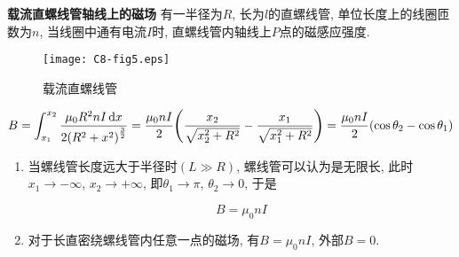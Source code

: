 \begin{example}
	\textbf{载流直螺线管轴线上的磁场} \quad 有一半径为$R$, 长为$l$的直螺线管, 单位长度上的线圈匝数为$n$, 当线圈中通有电流$I$时, 直螺线管内轴线上$P$点的磁感应强度. 
	
	\begin{figure}[H]
		\centering
		\texttt{[image: C8-fig5.eps]}
		\caption{载流直螺线管}
		\label{C8-fig5}
	\end{figure}
	
	\begin{solution}
		
		\begin{equation*}
			B = \int_{x_1}^{x_2} \dfrac{\mu_0 R^2 n I \dd{x}}{2 \qty(R^2 + x^2)^{\frac{3}{2}}} = \dfrac{\mu_0 n I}{2} \qty(\dfrac{x_2}{\sqrt{x_2^2 + R^2}} - \dfrac{x_1}{\sqrt{x_1^2 + R^2}}) = \dfrac{\mu_0 n I}{2} \qty(\cos \theta_2 - \cos \theta_1)
		\end{equation*}
		
		\begin{enumerate}[itemindent=1em]
			
			\item 当螺线管长度远大于半径时$(L \gg R)$, 螺线管可以认为是无限长, 此时$x_1 \to - \infty$, $x_2 \to + \infty$, 即$\theta_1 \to \pi$, $\theta_2 \to 0$, 于是
			
			\begin{equation*}
				B = \mu_0 n I
			\end{equation*}
			
			\item 对于长直密绕螺线管内任意一点的磁场, 有$B = \mu_0 n I$, 外部$B = 0$.
			
		\end{enumerate}
		
	\end{solution}

\end{example}


